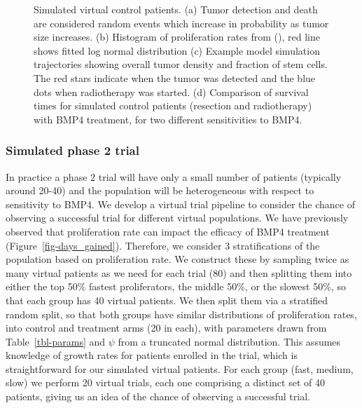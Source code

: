 \documentclass[
  letterpaper,
]{scrreprt}
\theoremstyle{definition}
\theoremstyle{remark}
\begin{document}
\begin{figure}
\begin{minipage}{0.50\linewidth}
{}

\subcaption{\label{fig-simulated_control_KM}}

\end{minipage}%

\caption{\label{fig-simulated-controls}Simulated virtual control
patients. (a) Tumor detection and death are considered random events
which increase in probability as tumor size increases. (b) Histogram of
proliferation rates from (),
red line shows fitted log normal distribution (c) Example model
simulation trajectories showing overall tumor density and fraction of
stem cells. The red stars indicate when the tumor was detected and the
blue dots when radiotherapy was started. (d) Comparison of survival
times for simulated control patients (resection and radiotherapy) with
BMP4 treatment, for two different sensitivities to BMP4.}

\end{figure}%

\subsubsection{Simulated phase 2 trial}\label{sec-phase-2-trial}

In practice a phase 2 trial will have only a small number of patients
(typically around 20-40) and the population will be heterogeneous with
respect to sensitivity to BMP4. We develop a virtual trial pipeline to
consider the chance of observing a successful trial for different
virtual populations. We have previously observed that proliferation rate
can impact the efficacy of BMP4 treatment
(Figure~\ref{fig-days_gained}). Therefore, we consider 3 stratifications
of the population based on proliferation rate. We construct these by
sampling twice as many virtual patients as we need for each trial (80)
and then splitting them into either the top 50\% fastest proliferators,
the middle 50\%, or the slowest 50\%, so that each group has 40 virtual
patients. We then split them via a stratified random split, so that both
groups have similar distributions of proliferation rates, into control
and treatment arms (20 in each), with parameters drawn from
Table~\ref{tbl-params} and \(\psi\) from a truncated normal
distribution. This assumes knowledge of growth rates for patients
enrolled in the trial, which is straightforward for our simulated
virtual patients. For each group (fast, medium, slow) we perform 20
virtual trials, each one comprising a distinct set of 40 patients,
giving us an idea of the chance of observing a successful trial.
\end{document}
